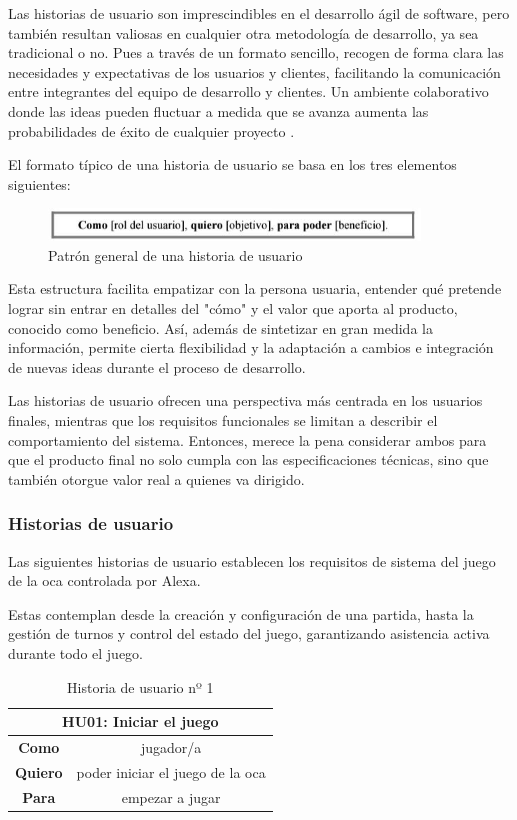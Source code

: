 Las historias de usuario son imprescindibles en el desarrollo ágil de software, pero también resultan valiosas en cualquier otra metodología de desarrollo, ya sea tradicional o no. Pues a través de un formato sencillo, recogen de forma clara las necesidades y expectativas de los usuarios y clientes, facilitando la comunicación entre integrantes del equipo de desarrollo y clientes. Un ambiente colaborativo donde las ideas pueden fluctuar a medida que se avanza aumenta las probabilidades de éxito de cualquier proyecto \parencite{introHU}.

El formato típico de una historia de usuario se basa en los  tres elementos siguientes:

\begin{figure}[H]
	\centering
	\includegraphics[width=0.88\textwidth]{imgs/formatoHU.jpg}
	\caption{Patrón general de una historia de usuario}
	\label{fig:formatoHU}
\end{figure}

Esta estructura facilita empatizar con la persona usuaria, entender qué pretende lograr sin entrar en detalles del "cómo" y el valor que aporta al producto, conocido como beneficio. Así, además de sintetizar en gran medida la información, permite cierta flexibilidad y la adaptación a cambios e integración de nuevas ideas durante el proceso de desarrollo.

Las historias de usuario ofrecen una perspectiva más centrada en los usuarios finales, mientras que los requisitos funcionales se limitan a describir el comportamiento del sistema. Entonces, merece la pena considerar ambos para que el producto final no solo cumpla con las especificaciones técnicas, sino que también otorgue valor real a quienes va dirigido.

\subsubsection{Historias de usuario}

Las siguientes historias de usuario establecen los requisitos de sistema del juego de la oca controlada por Alexa.

Estas contemplan desde la creación y configuración de una partida, hasta la gestión de turnos y control del estado del juego, garantizando asistencia activa durante todo el juego.

\begin{table}[H]
    \centering
    \begin{tabular}{|c|c|}
        \hline
        \multicolumn{2}{|c|}{\textbf{HU01}: Iniciar el juego} \\
        \hline
        \textbf{Como} & jugador/a \\
        \hline
        \textbf{Quiero} & poder iniciar el juego de la oca \\
        \hline
        \textbf{Para} & empezar a jugar \\
        \hline
    \end{tabular}
    \caption{Historia de usuario nº 1}
    \label{tab:HU01}
\end{table}


